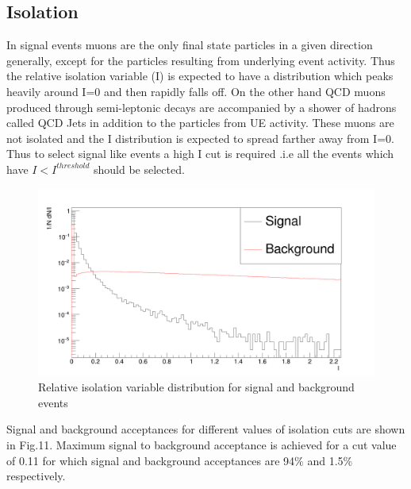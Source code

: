 \documentclass{article}		%
\begin{document}
\newpage
\subsection{Isolation}

In signal events muons are the only final state particles in a given direction generally, except for the particles resulting from underlying event activity. Thus the relative isolation variable (I) is expected to have a distribution which peaks heavily around I=0 and then rapidly falls off. On the other hand QCD muons produced through semi-leptonic decays are accompanied by a shower of hadrons called QCD Jets in addition to the particles from UE activity. These muons are not isolated and the I distribution is expected to spread farther away from I=0. Thus to select signal like events a high I cut is required .i.e all the events which have $I<I^{threshold }$ should be selected.        

\begin{figure}[h]
	\begin{center}
		\includegraphics[scale=0.2]{Isvsbg.png} 
		\caption{Relative isolation variable distribution for signal and background events} 		
	\end{center}
	\centering	
\end{figure}
			
Signal and background acceptances for different values of isolation cuts are shown in Fig.11. Maximum signal to background acceptance is achieved for a cut value of 0.11 for which signal and background acceptances are 94$\%$ and 1.5$\%$ respectively.	 	
\end{document}
